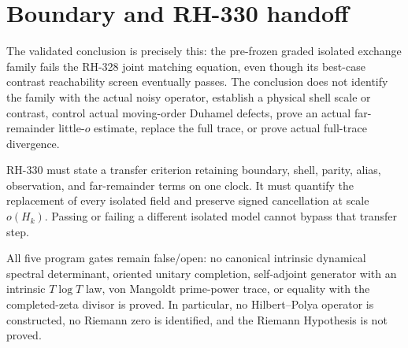 \documentclass[11pt]{article}
\theoremstyle{remark}
\begin{document}
\section{Boundary and RH-330 handoff}

The validated conclusion is precisely this: the pre-frozen graded isolated
exchange family fails the RH-328 joint matching equation, even though its
best-case contrast reachability screen eventually passes.  The conclusion
does not identify the family with the actual noisy operator, establish a
physical shell scale or contrast, control actual moving-order Duhamel
defects, prove an actual far-remainder little-$o$ estimate, replace the full
trace, or prove actual full-trace divergence.

RH-330 must state a transfer criterion retaining boundary, shell, parity,
alias, observation, and far-remainder terms on one clock.  It must quantify
the replacement of every isolated field and preserve signed cancellation at
scale $o(H_k)$.  Passing or failing a different isolated model cannot bypass
that transfer step.

All five program gates remain false/open: no canonical intrinsic dynamical
spectral determinant, oriented unitary completion, self-adjoint generator
with an intrinsic $T\log T$ law, von Mangoldt prime-power trace, or equality
with the completed-zeta divisor is proved.  In particular, no
Hilbert--Polya operator is constructed, no Riemann zero is identified, and
the Riemann Hypothesis is not proved.
\end{document}

